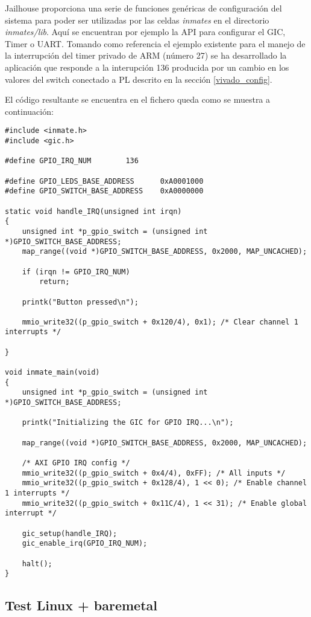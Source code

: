 Jailhouse proporciona una serie de funciones genéricas de configuración del sistema para poder ser utilizadas por las celdas \textit{inmates} en el directorio \textit{inmates/lib}. Aquí se encuentran por ejemplo la API para configurar el \acrshort{GIC}, Timer o \acrshort{UART}. Tomando como referencia el ejemplo existente para el manejo de la interrupción del timer privado de ARM (número 27) se ha desarrollado la aplicación que responde a la interupción 136 producida por un cambio en los valores del switch conectado a \acrshort{PL} descrito en la sección \ref{vivado_config}.

El código resultante se encuentra en el fichero queda como se muestra a continuación:
\begin{lstlisting}[style=CStyle]
#include <inmate.h>
#include <gic.h>

#define GPIO_IRQ_NUM		136

#define GPIO_LEDS_BASE_ADDRESS  	0xA0001000
#define GPIO_SWITCH_BASE_ADDRESS  	0xA0000000

static void handle_IRQ(unsigned int irqn)
{
    unsigned int *p_gpio_switch = (unsigned int *)GPIO_SWITCH_BASE_ADDRESS;
    map_range((void *)GPIO_SWITCH_BASE_ADDRESS, 0x2000, MAP_UNCACHED);

	if (irqn != GPIO_IRQ_NUM)
		return;

	printk("Button pressed\n");

    mmio_write32((p_gpio_switch + 0x120/4), 0x1); /* Clear channel 1 interrupts */

}

void inmate_main(void)
{
	unsigned int *p_gpio_switch = (unsigned int *)GPIO_SWITCH_BASE_ADDRESS;

	printk("Initializing the GIC for GPIO IRQ...\n");

    map_range((void *)GPIO_SWITCH_BASE_ADDRESS, 0x2000, MAP_UNCACHED);

	/* AXI GPIO IRQ config */
	mmio_write32((p_gpio_switch + 0x4/4), 0xFF); /* All inputs */
	mmio_write32((p_gpio_switch + 0x128/4), 1 << 0); /* Enable channel 1 interrupts */
	mmio_write32((p_gpio_switch + 0x11C/4), 1 << 31); /* Enable global interrupt */

	gic_setup(handle_IRQ);
	gic_enable_irq(GPIO_IRQ_NUM);

	halt();
}
\end{lstlisting}

\subsection{Test Linux + baremetal}


